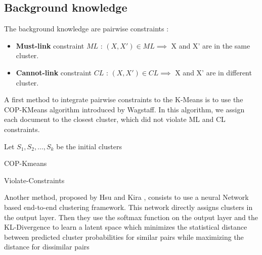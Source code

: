 \subsection{Background knowledge}
The background knowledge are pairwise constraints :
\begin{itemize}
\item \textbf{Must-link} constraint $ML$ : $(X, X') \in ML \implies $ X and X' are in the
  same cluster.
\item \textbf{Cannot-link} constraint $CL$ : $(X, X') \in CL \implies $ X and X' are in
  different cluster.
\end{itemize}
A first method to integrate pairwise constraints to the K-Means is to use the 
COP-KMeans algorithm introduced by Wagstaff\cite{Wagstaff:2001:CKC:645530.655669}.
In this algorithm, we assign each document to the closest cluster, 
which did not violate ML and CL constraints.
\begin{algorithm}[!h]
  Let $S_1, S_2 , ..., S_k$ be the initial clusters\\
  \caption{COP-Kmeans}
\end{algorithm}
\begin{algorithm}[!h]
  \caption{Violate-Constraints}
\end{algorithm}
Another method, proposed by Hsu and Kira \cite{2015arXiv151106321H}, consists to 
use a neural Network based end-to-end clustering framework. This network 
directly assigns clusters in the output layer. Then they use the softmax 
function on the output layer and the KL-Divergence to learn a latent space 
which minimizes the statistical distance between predicted cluster probabilities 
for similar pairs while maximizing the distance for dissimilar pairs

